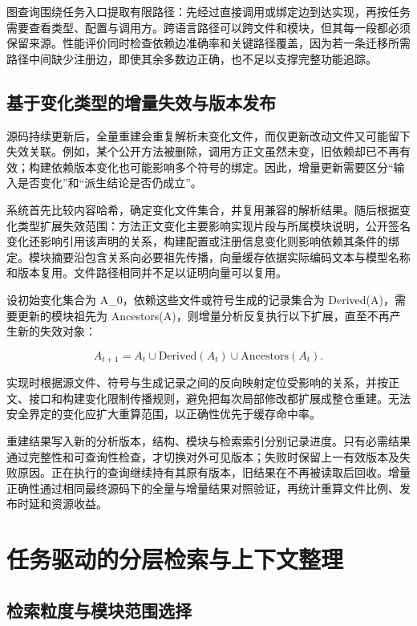图查询围绕任务入口提取有限路径：先经过直接调用或绑定边到达实现，再按任务需要查看类型、配置与调用方。跨语言路径可以跨文件和模块，但其每一段都必须保留来源。性能评价同时检查依赖边准确率和关键路径覆盖，因为若一条迁移所需路径中间缺少注册边，即使其余多数边正确，也不足以支撑完整功能追踪。

\section{基于变化类型的增量失效与版本发布}

源码持续更新后，全量重建会重复解析未变化文件，而仅更新改动文件又可能留下失效关联。例如，某个公开方法被删除，调用方正文虽然未变，旧依赖却已不再有效；构建依赖版本变化也可能影响多个符号的绑定。因此，增量更新需要区分“输入是否变化”和“派生结论是否仍成立”。

系统首先比较内容哈希，确定变化文件集合，并复用兼容的解析结果。随后根据变化类型扩展失效范围：方法正文变化主要影响实现片段与所属模块说明，公开签名变化还影响引用该声明的关系，构建配置或注册信息变化则影响依赖其条件的绑定。模块摘要沿包含关系向必要祖先传播，向量缓存依据实际编码文本与模型名称和版本复用。文件路径相同并不足以证明向量可以复用。

设初始变化集合为 A\_0，依赖这些文件或符号生成的记录集合为 Derived(A)，需要更新的模块祖先为 Ancestors(A)，则增量分析反复执行以下扩展，直至不再产生新的失效对象：

\begin{equation}
A_{t+1}=A_t\cup\mathrm{Derived}(A_t)\cup\mathrm{Ancestors}(A_t).
\end{equation}

实现时根据源文件、符号与生成记录之间的反向映射定位受影响的关系，并按正文、接口和构建变化限制传播规则，避免把每次局部修改都扩展成整仓重建。无法安全界定的变化应扩大重算范围，以正确性优先于缓存命中率。

重建结果写入新的分析版本，结构、模块与检索索引分别记录进度。只有必需结果通过完整性和可查询性检查，才切换对外可见版本；失败时保留上一有效版本及失败原因。正在执行的查询继续持有其原有版本，旧结果在不再被读取后回收。增量正确性通过相同最终源码下的全量与增量结果对照验证，再统计重算文件比例、发布时延和资源收益。

\chapter{任务驱动的分层检索与上下文整理}
\label{chap:methods}

\section{检索粒度与模块范围选择}

